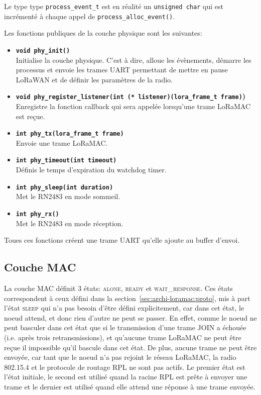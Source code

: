     Le type type \texttt{process\_event\_t} est en réalité un \texttt{unsigned char} qui est incrémenté à chaque appel de \texttt{process\_alloc\_event()}.

    Les fonctions publiques de la couche physique sont les suivantes:
    \begin{itemize}
        \item \textbf{\texttt{void phy\_init()}}\\
            Initialise la couche physique. C'est à dire, alloue les évènements, démarre les 
            processus et envoie les trames UART permettant de mettre en pause LoRaWAN et de définir 
            les paramètres de la radio.
        \item \textbf{\texttt{void phy\_register\_listener(int (* listener)(lora\_frame\_t frame)})}\\
            Enregistre la fonction callback qui sera appelée lorsqu'une trame LoRaMAC est reçue.
        \item \textbf{\texttt{int phy\_tx(lora\_frame\_t frame)}}\\
            Envoie une trame LoRaMAC.
        \item \textbf{\texttt{int phy\_timeout(int timeout)}}\\
            Définis le temps d'expiration du watchdog timer.
        \item \textbf{\texttt{int phy\_sleep(int duration)}}\\
            Met le RN2483 en mode sommeil.
        \item \textbf{\texttt{int phy\_rx()}}\\
            Met le RN2483 en mode réception.
    \end{itemize}

    Toues ces fonctions créent une trame UART qu'elle ajoute au buffer d'envoi.

\subsection*{Couche MAC}
    La couche MAC définit 3 états: \textsc{alone}, \textsc{ready} et \textsc{wait\_response}.
    Ces états correspondent à ceux défini dans la section~\ref{sec:archi-loramac:proto}, mis à part l'état \textsc{sleep} qui n'a pas 
    besoin d'être défini explicitement, car dans cet état, le noeud attend, et donc rien d'autre ne peut se 
    passer. En effet, comme le noeud ne peut basculer dans cet état que si le transmission d'une 
    trame JOIN a échouée (i.e. après trois retransmissions), et qu'aucune trame LoRaMAC ne peut être reçue il impossible qu'il bascule dans cet état.
    De plus, aucune trame ne peut être envoyée, car tant que le noeud n'a pas rejoint le réseau LoRaMAC, 
    la radio 802.15.4 et le protocole de routage RPL ne sont pas actifs.
    Le premier état est l'état initiale, le second est utilisé quand la racine RPL est prête à 
    envoyer une trame et le dernier est utilisé quand elle attend une réponse à une trame envoyée.

